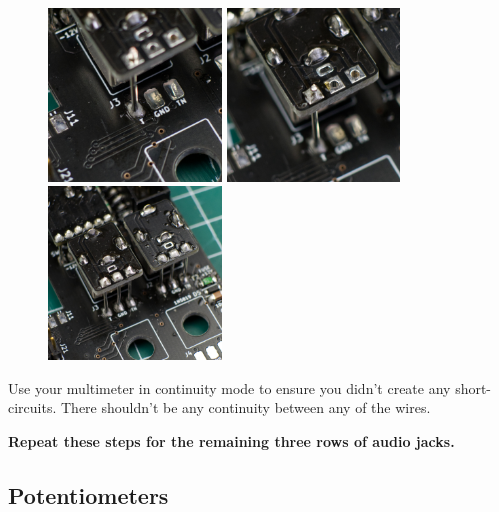 \documentclass[12pt, a4paper]{article}
\begin{document}
\begin{figure}[H]
    \centering
    \includegraphics[width=46mm]{images/section_3-3_single_bot.jpg}
    \hspace{2mm}
    \includegraphics[width=46mm]{images/section_3-3_single_top.jpg}
    \hspace{2mm}
    \includegraphics[width=46mm]{images/section_3-3_full.jpg}
\end{figure}

Use your multimeter in continuity mode to ensure you didn't create any short-circuits. There
shouldn't be any continuity between any of the wires.

\textbf{Repeat these steps for the remaining three rows of audio jacks.}

\subsection{Potentiometers}
\end{document}
